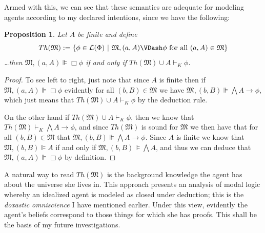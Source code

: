 \documentclass[11pt]{article}
\numberwithin{equation}{subsection}
\newtheorem{prop}[theorem]{Proposition}
\renewcommand{\Omega}{\mathfrak{M}}
\begin{document}
Armed with this, we can see that these semantics are adequate for modeling agents according to my declared intentions, since we have the following:
\begin{prop}\label{central-prop}
 Let $A$ be finite and define $$Th(\Omega) := \{ \phi \in \mathcal{L}(\Phi) \ |\ \Omega, (a,A) \VDash \phi \textup{ for all $(a,A) \in \Omega$\}}$$
\ldots then $\Omega, (a,A) \VDash \Box \phi$ if and only if $Th(\Omega) \cup A \vdash_K \phi$.
\end{prop}
\begin{proof}
 To see left to right, just note that since $A$ is finite then if $\Omega, (a,A) \VDash \Box \phi$ evidently for all $(b,B)\in \Omega$ we have $\Omega, (b,B) \VDash \bigwedge A \to \phi$, which just means that $Th(\Omega) \cup A \vdash_K \phi$ by the deduction rule.

On the other hand if $Th(\Omega) \cup A \vdash_K \phi$, then we know that $Th(\Omega) \vdash_K \bigwedge A \to \phi$, and since $Th(\Omega)$ is sound for $\Omega$ we then have that for all $(b,B) \in \Omega$ that $\Omega,(b,B)\VDash \bigwedge A \to \phi$.  Since $A$ is finite we know that  $\Omega,(b,B) \VDash A$ if and only if $\Omega,(b,B) \VDash \bigwedge A$, and thus we can deduce that $\Omega,(a,A)\VDash \Box \phi$ by definition.
\end{proof}

A natural way to read $Th(\Omega)$ is the background knowledge the agent has about the universe she lives in.  This approach presents an analysis of modal logic whereby an idealized agent is modeled as closed under deduction; this is the \emph{doxastic omniscience} I have mentioned earlier. Under this view, evidently the agent's beliefs correspond to those things for which she has proofs.  This shall be the basis of my future investigations.

\end{document}
